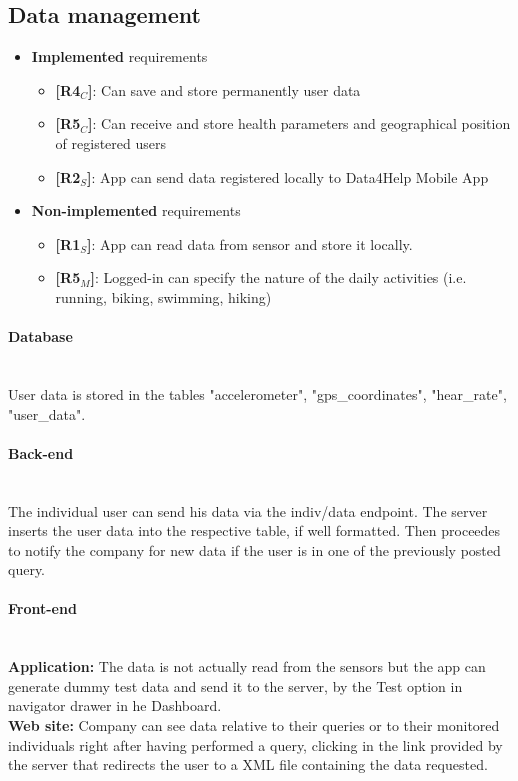 \subsection{Data management}
\begin{itemize}
    \item \textbf{Implemented} requirements
        \begin{itemize}
    
        \item \textbf{[R4$_C$]}: Can save and store permanently user data
    \item \textbf{[R5$_C$]}: Can receive and store health parameters and geographical position of registered users
     \item \textbf{[R2$_S$]}: App can send data registered locally to Data4Help Mobile App

        \end{itemize}
    \item \textbf{Non-implemented} requirements
    \begin{itemize}
    \item \textbf{[R1$_S$]}: App can read data from sensor and store it locally.
     
      \item \textbf{[R5$_M$]}: Logged-in can specify the nature of the daily activities (i.e. running, biking, swimming, hiking)

        \end{itemize}
\end{itemize}

\paragraph{Database} \mbox{}\\  
User data is stored in the tables "accelerometer", "gps\_coordinates", "hear\_rate", "user\_data".


\paragraph{Back-end} \mbox{}\\  
The individual user can send his data via the {indiv/data} endpoint.
The server inserts the user data into the respective table, if well formatted.
Then proceedes to notify the company for new data if the user is in one of the previously posted query.

\paragraph{Front-end} \mbox{}\\
\textbf{Application:} The data is not actually read from the sensors but the app can generate dummy test data and send it to the server, by the Test option in navigator drawer in he Dashboard.\\
\textbf{Web site: }Company can see data relative to their queries or to their monitored individuals right after having performed a query, clicking in the link provided by the server that redirects the user to a XML file containing the data requested.



